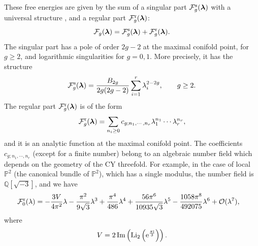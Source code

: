 \documentclass[a4paper,11pt]{article}
\theoremstyle{definition}
\newcommand{\CF}{{\cal F}}
\newcommand{\CO}{{\cal O}}
\def\IP{{\mathbb P}}
\newcommand{\re}{{\rm e}}
\newcommand{\ri}{{\rm i}}
\def\blambda{\boldsymbol{\lambda}}
\newcommand{\be}{\begin{equation}}
\newcommand{\ee}{\end{equation}}
\newcommand{\ba}{\begin{aligned}}
\newcommand{\ea}{\end{aligned}}
\begin{document}
These free energies are given by the sum of a singular part $\CF_g^{\rm s}(\blambda)$ with a universal structure \cite{gv-conifold}, and a 
regular part $\CF_g^{\rm r}(\blambda)$:
%
\be
\CF_g(\blambda)=\CF_g^{\rm s}(\blambda)+ \CF_g^{\rm r}(\blambda).
\ee
%
The singular part has a pole of order $2g-2$ at the maximal conifold point, for $g\ge 2$, and logarithmic singularities for 
$g=0,1$. More precisely, it has the structure
%
\be
\label{con-sr}
\CF_g^{\rm s}(\blambda)={B_{2 g} \over 2g(2g-2)} \sum_{i=1}^r \lambda_i^{2-2g}, \qquad g \ge 2. 
\ee
%
The regular part $\CF_g^{\rm r}(\blambda)$ is of the form 
%
\be
\label{cr-exp}
\CF_g^{\rm r}(\blambda)= \sum_{n_i \ge 0} c_{g; n_1, \cdots, n_r} \lambda_1^{n_1} \cdots \lambda_r^{n_r},
\ee
%
and it is an analytic function at the maximal conifold point. The
coefficients $c_{g;n_1, \cdots, n_r}$ (except for a finite number)
belong to an algebraic number field which depends on the geometry of
the CY threefold. For example, in the case of local $\IP^2$ (the
canonical bundle of $\IP^2$), which has a single modulus, the number
field is $\mathbb{Q}[{\sqrt{-3}}]$, and we have
%
\be
\label{f0ex}
\ba
\CF_0^{\rm r}(\lambda)&= -\frac{3 V}{4 \pi^2}\lambda  -\frac{\pi^2}{9 \sqrt{3}}\lambda^3+\frac{\pi^4}{486}\lambda^4+\frac{56\pi^6}{10 935 \sqrt{3}}\lambda^5-\frac{1058 \pi^8}{492075}\lambda^6+\CO(\lambda^7), 
\ea
\ee
%
where
%
\be
 \label{eight}
 V= 2 \, {\rm Im}\left( {\rm Li}_2 \left(\re^{\pi \ri \over 3} \right) \right).
 \ee
\end{document}
